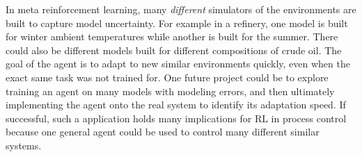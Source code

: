 In meta reinforcement learning, many \textit{different} simulators of the environments are built to capture model uncertainty.  For example in a refinery, one model is built for winter ambient temperatures while another is built for the summer.  There could also be different models built for different compositions of crude oil.  The goal of the agent is to adapt to new similar environments quickly, even when the exact same task was not trained for.  One future project could be to explore training an agent on many models with modeling errors, and then ultimately implementing the agent onto the real system to identify its adaptation speed.  If successful, such a application holds many implications for RL in process control because one general agent could be used to control many different similar systems.